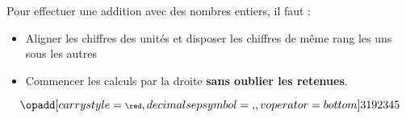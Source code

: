 \begin{pageCours}
\begin{Mt}
Pour effectuer une addition avec des nombres entiers, il faut :
\begin{itemize}
    \item Aligner les chiffres des unités et disposer les chiffres de même rang les uns sous les autres
    \item Commencer les calculs par la droite \textbf{sans oublier les retenues}.
\end{itemize}
\bigskip
\[\opadd[carrystyle=\scriptsize\red,
decimalsepsymbol={,},
voperator=bottom]{3192}{345}\]
\end{Mt} 


\end{pageCours}

\begin{pageAD}



\end{pageAD}

